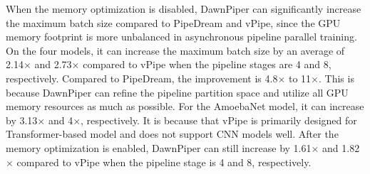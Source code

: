 When the memory optimization is disabled,
DawnPiper can significantly increase the maximum batch size compared to PipeDream and vPipe,
since the GPU memory footprint is more unbalanced in asynchronous pipeline parallel training.
On the four models, it can increase the maximum batch size
by an average of 2.14$\times$ and 2.73$\times$ compared to vPipe
when the pipeline stages are 4 and 8, respectively.
Compared to PipeDream, the improvement is 4.8$\times$ to 11$\times$.
This is because DawnPiper can refine the pipeline partition space
and utilize all GPU memory resources as much as possible.
For the AmoebaNet model, it can increase by 3.13$\times$ and 4$\times$, respectively.
It is because that vPipe is primarily designed for Transformer-based model
and does not support CNN models well.
After the memory optimization is enabled,
DawnPiper can still increase by 1.61$\times$ and 1.82$\times$
compared to vPipe when the pipeline stage is 4 and 8, respectively.

